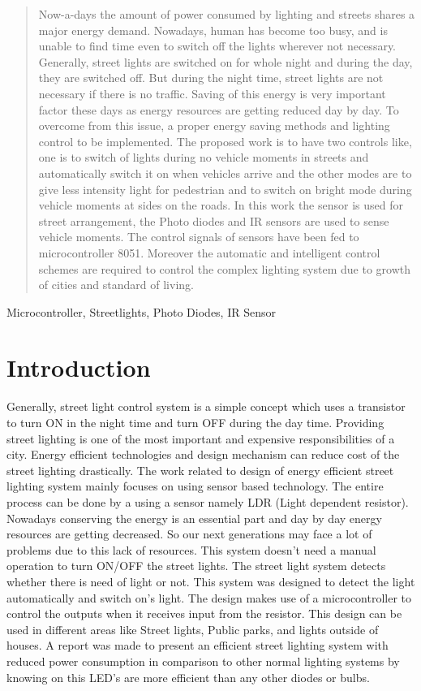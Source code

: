 \documentclass[conference]{IEEEtran}
\begin{document}
\begin{abstract}

Now-a-days the amount of power consumed by lighting and streets shares a major energy demand. Nowadays,
human has become too busy, and is unable to find time even to switch off the lights wherever not necessary.
Generally, street lights are switched on for whole night and during the day, they are switched off. But during
the night time, street lights are not necessary if there is no traffic. Saving of this energy is very important factor
these days as energy resources are getting reduced day by day. To overcome from this issue, a proper energy
saving methods and lighting control to be implemented. The proposed work is to have two controls like, one is
to switch of lights during no vehicle moments in streets and automatically switch it on when vehicles arrive
and the other modes are to give less intensity light for pedestrian and to switch on bright mode during vehicle
moments at sides on the roads. In this work the sensor is used for street arrangement, the Photo diodes and IR
sensors are used to sense vehicle moments. The control signals of sensors have been fed to microcontroller 8051.
Moreover the automatic and intelligent control schemes are required to control the complex lighting system
due to growth of cities and standard of living. 
\end{abstract}

\begin{IEEEkeywords}
Microcontroller, Streetlights, Photo Diodes, IR Sensor 
\end{IEEEkeywords}

\section{Introduction}
Generally, street light control system is a simple
concept which uses a transistor to turn ON in the
night time and turn OFF during the day time.
Providing street lighting is one of the most important
and expensive responsibilities of a city. Energy
efficient technologies and design mechanism can
reduce cost of the street lighting drastically. The work
related to design of energy efficient street lighting
system mainly focuses on using sensor based
technology. The entire process can be done by a using
a sensor namely LDR (Light dependent resistor).
Nowadays conserving the energy is an essential part
and day by day energy resources are getting decreased.
So our next generations may face a lot of problems
due to this lack of resources. This system doesn’t need
a manual operation to turn ON/OFF the street lights.
The street light system detects whether there is need
of light or not. This system was designed to detect the
light automatically and switch on's light. The design
makes use of a microcontroller to control the outputs
when it receives input from the resistor.
This design can be used in different areas like Street
lights, Public parks, and lights outside of houses. A
report was made to present an efficient street lighting
system with reduced power consumption in
comparison to other normal lighting systems by
knowing on this LED’s are more efficient than any
other diodes or bulbs.  
\end{document}
